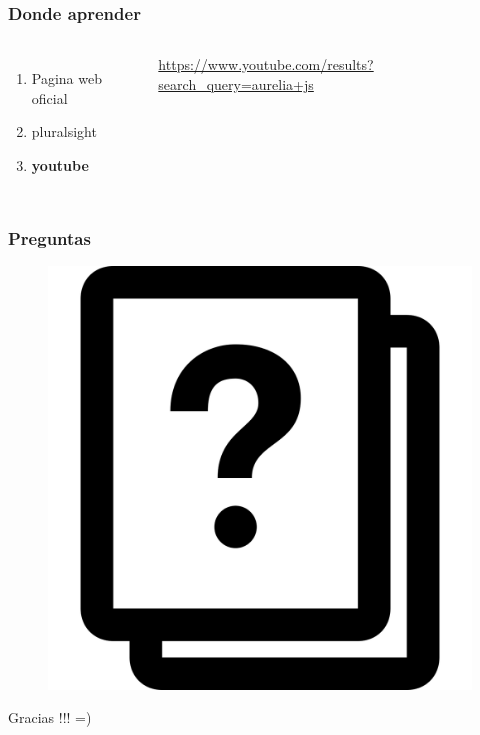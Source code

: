 \documentclass{beamer}
\begin{document}
\begin{frame}
\frametitle{Donde aprender}
\begin{columns}[c]
\begin{enumerate}
\item Pagina web oficial
\item pluralsight
\item \textbf{youtube}
\end{enumerate}
{\color{blue}\url{https://www.youtube.com/results?search_query=aurelia+js}}
\end{columns}
\end{frame}
\begin{frame}
\frametitle{Preguntas}
\begin{figure}
\includegraphics[width=0.4\linewidth]{preguntas.png}
\end{figure}
\end{frame}
\begin{frame}
\Huge{\centerline{Gracias !!! =)}}
\end{frame}
\end{document}
